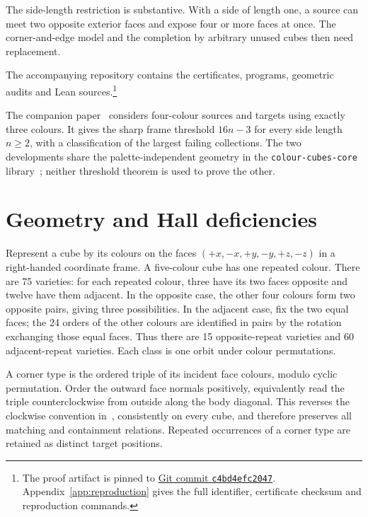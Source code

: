 \documentclass[11pt]{article}
\theoremstyle{remark}
\begin{document}
The side-length restriction is substantive. With a side of length one,
a source can meet two opposite exterior faces and expose four or more
faces at once. The corner-and-edge model and the completion by arbitrary
unused cubes then need replacement.

The accompanying repository contains the certificates, programs,
geometric audits and Lean sources.\footnote{The proof artifact is pinned to
\href{https://github.com/jasondavies/five-colour-cubes/tree/c4bd4efc20472049b7492589d8c86b573b32e0a0}{Git commit \texttt{c4bd4efc2047}}.
Appendix~\ref{app:reproduction} gives the full identifier, certificate checksum
and reproduction commands.}

The companion paper~\cite{FourToThree} considers four-colour sources and
targets using exactly three colours. It gives the sharp frame threshold
$16n-3$ for every side length $n\ge2$, with a classification of the largest
failing collections. The two developments share the palette-independent
geometry in the \texttt{colour-\allowbreak cubes-\allowbreak core} library~\cite{ColourCubes};
neither threshold theorem is used to prove the other.

\section{Geometry and Hall deficiencies}\label{sec:model}
Represent a cube by its colours on the faces
$(+x,-x,+y,-y,+z,-z)$ in a right-handed coordinate frame. A five-colour cube
has one repeated colour. There are 75 varieties: for each repeated colour,
three have its two faces opposite and twelve have them adjacent. In the
opposite case, the other four colours form two opposite pairs, giving three
possibilities. In the adjacent case, fix the two equal faces; the 24 orders
of the other colours are identified in pairs by the rotation exchanging
those equal faces. Thus there are 15 opposite-repeat varieties and 60
adjacent-repeat varieties. Each class is one orbit under colour permutations.

A corner type is the ordered triple of its incident face colours, modulo
cyclic permutation. Order the outward face normals positively, equivalently
read the triple counterclockwise from outside along the body diagonal.
This reverses the clockwise convention in~\cite{BES}, consistently on every
cube, and therefore preserves all matching and containment relations.
Repeated occurrences of a corner type are retained as distinct target
positions.
\end{document}
